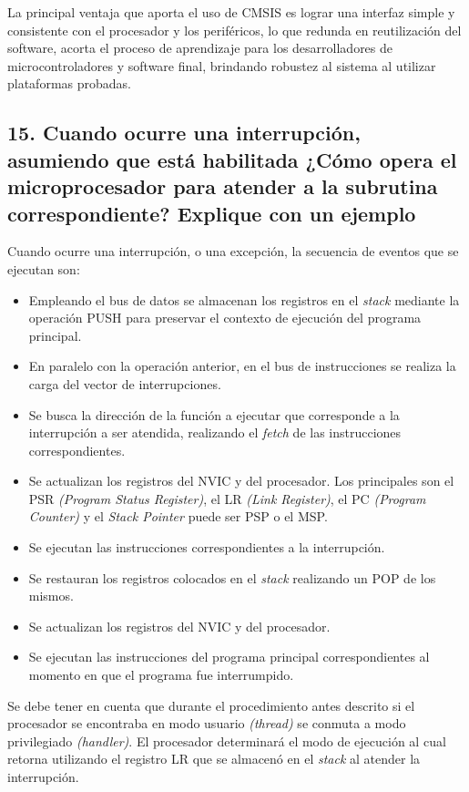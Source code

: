 \documentclass[10pt,a4paper,twoside,spanish]{article}	%
\begin{document}
La principal ventaja que aporta el uso de CMSIS es lograr una interfaz simple y consistente con el procesador y los periféricos, lo que redunda en  reutilización del software, acorta el proceso de aprendizaje para los desarrolladores de microcontroladores y software final, brindando robustez al sistema al utilizar plataformas probadas. 

\subsection*{15. Cuando ocurre una interrupción, asumiendo que está habilitada ¿Cómo opera el microprocesador para atender a la subrutina correspondiente? Explique con un ejemplo}

Cuando ocurre una interrupción, o una excepción, la secuencia de eventos que se ejecutan son:

\begin{itemize}
\item Empleando el bus de datos se almacenan los registros en el \textit{stack} mediante la operación PUSH para preservar el contexto de ejecución del programa principal. 
\item En paralelo con la operación anterior, en el bus de instrucciones se realiza la carga del vector de interrupciones.
\item Se busca la dirección de la función a ejecutar que corresponde a la interrupción a ser atendida, realizando el \textit{fetch} de las instrucciones correspondientes.
\item Se actualizan los registros del NVIC y del procesador. Los principales son el PSR \textit{(Program Status Register)}, el LR \textit{(Link Register)}, el PC \textit{(Program Counter)} y el \textit{Stack Pointer} puede ser PSP o el MSP. 

\item Se ejecutan las instrucciones correspondientes a la interrupción.

\item Se restauran los registros colocados en el \textit{stack} realizando un POP de los mismos.
\item Se actualizan los registros del NVIC y del procesador.
\item Se ejecutan las instrucciones del programa principal correspondientes al momento en que el programa fue interrumpido.

\end{itemize}

Se debe tener en cuenta que durante el procedimiento antes descrito si el procesador se encontraba en modo usuario \textit{(thread)} se conmuta a modo privilegiado \textit{(handler)}. El procesador determinará el modo de ejecución al cual retorna utilizando el registro LR que se almacenó en el \textit{stack} al atender la interrupción.
\end{document}
